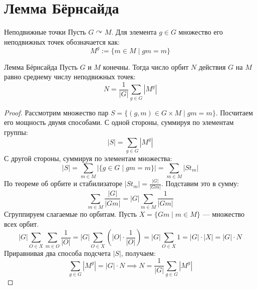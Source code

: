 \section{Лемма Бёрнсайда}

\begin{Definition}{Неподвижные точки}{}
	Пусть $G \curvearrowright M$.
	Для элемента $g \in G$ множество его неподвижных точек обозначается как:
	\[ M^g := \{m \in M \mid gm = m\} \] 
\end{Definition}

\begin{Lemma}{Лемма Бёрнсайда}{}
	Пусть $G$ и $M$ конечны.
	Тогда число орбит $N$ действия $G$ на $M$ равно среднему числу неподвижных точек:
	\[ N = \frac{1}{|G|} \sum_{g \in G} |M^g| \] 
\end{Lemma}

\begin{proof}
	Рассмотрим множество пар $S = \{(g, m) \in G \times M \mid gm = m\}$. Посчитаем его мощность двумя способами.
	С одной стороны, суммируя по элементам группы:
	\[ |S| = \sum_{g \in G} |M^g| \] 
	С другой стороны, суммируя по элементам множества:
	\[ |S| = \sum_{m \in M} |\{g \in G \mid gm = m\}| = \sum_{m \in M} |St_m| \] 
	По теореме об орбите и стабилизаторе $|St_m| = \frac{|G|}{|Gm|}$.
	Подставим это в сумму:
	\[ \sum_{m \in M} \frac{|G|}{|Gm|} = |G| \sum_{m \in M} \frac{1}{|Gm|} \] 
	Сгруппируем слагаемые по орбитам.
	Пусть $X = \{Gm \mid m \in M\}$ — множество всех орбит.
	\[ |G| \sum_{O \in X} \sum_{m \in O} \frac{1}{|O|} = |G| \sum_{O \in X} \left( |O| \cdot \frac{1}{|O|} \right) = |G| \sum_{O \in X} 1 = |G| \cdot |X| = |G| \cdot N \] 
	Приравнивая два способа подсчета $|S|$, получаем:
	\[ \sum_{g \in G} |M^g| = |G| \cdot N \implies N = \frac{1}{|G|} \sum_{g \in G} |M^g| \] 
\end{proof}

